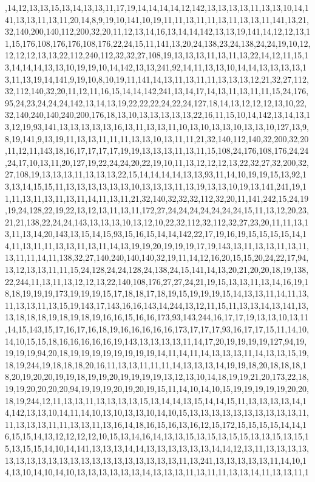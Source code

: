 ,14,12,13,13,15,13,14,13,13,11,17,19,14,14,14,14,12,142,13,13,13,13,11,13,13,10,14,141,13,13,11,13,11,20,14,8,9,19,10,141,10,19,11,11,13,11,11,13,11,13,13,11,141,13,21,32,140,200,140,112,200,32,20,11,12,13,14,16,13,14,14,142,13,13,19,141,14,12,12,13,11,15,176,108,176,176,108,176,22,24,15,11,141,13,20,24,138,23,24,138,24,24,19,10,12,12,12,12,13,13,22,112,240,112,32,32,27,108,19,13,13,13,11,13,11,13,22,14,12,11,15,13,14,14,14,13,13,10,19,19,10,14,142,13,13,241,92,14,11,13,13,10,14,14,13,13,13,13,13,11,13,19,14,141,9,19,10,8,10,19,11,141,14,13,11,13,11,11,13,13,13,12,21,32,27,112,32,112,140,32,20,11,12,11,16,15,14,14,142,241,13,14,17,14,13,11,13,11,11,15,24,176,95,24,23,24,24,24,142,13,14,13,19,22,22,22,24,22,24,127,18,14,13,12,12,12,13,10,22,32,140,240,140,240,200,176,18,13,10,13,13,13,13,13,22,16,11,15,10,14,142,13,14,13,13,12,19,93,141,13,13,13,13,13,16,13,11,13,13,11,10,13,10,13,13,10,13,13,10,127,13,9,8,19,141,9,13,19,11,13,13,11,11,11,13,13,10,13,11,11,21,32,140,112,140,32,200,32,20,11,12,11,143,18,16,17,17,17,17,19,19,13,13,13,11,13,11,15,108,24,176,108,176,24,24,24,17,10,13,11,20,127,19,22,24,24,20,22,19,10,11,13,12,12,12,13,22,32,27,32,200,32,27,108,19,13,13,13,11,13,13,13,22,15,14,14,14,14,13,13,93,11,14,10,19,19,15,13,92,13,13,14,15,15,11,13,13,13,13,13,13,10,13,13,13,11,13,19,13,13,10,19,13,141,241,19,11,11,13,11,13,11,13,11,14,11,13,11,21,32,140,32,32,32,112,32,20,11,141,242,15,24,19,19,24,128,22,19,22,13,12,13,11,13,11,172,27,24,24,24,24,24,24,24,15,11,13,12,20,23,21,21,138,22,24,24,143,13,13,13,10,13,12,10,22,32,112,32,112,32,27,23,20,11,11,13,13,11,13,14,20,143,13,15,14,15,93,15,16,15,14,14,142,22,17,19,16,19,15,15,15,15,14,14,11,13,11,11,13,13,11,13,11,14,13,19,19,20,19,19,19,17,19,143,13,11,13,13,11,13,11,13,11,11,14,11,138,32,27,140,240,140,140,32,19,11,14,12,16,20,15,15,20,24,22,17,94,13,12,13,13,11,11,15,24,128,24,24,128,24,138,24,15,141,14,13,20,21,20,20,18,19,138,22,244,11,13,11,13,12,12,13,22,140,108,176,27,27,24,21,19,15,13,13,11,13,14,16,19,18,18,19,19,19,173,19,19,19,15,17,18,18,17,18,19,15,19,19,19,15,14,13,13,11,14,11,13,11,13,13,11,13,15,19,143,17,143,16,16,143,14,244,13,12,11,15,11,13,13,14,13,141,13,13,18,18,18,19,18,19,18,19,16,16,15,16,16,173,93,143,244,16,17,17,19,13,13,10,13,11,14,15,143,15,17,16,17,16,18,19,16,16,16,16,16,173,17,17,17,93,16,17,17,15,11,14,10,14,10,15,15,18,16,16,16,16,16,19,143,13,13,13,13,11,14,17,20,19,19,19,19,127,94,19,19,19,19,94,20,18,19,19,19,19,19,19,19,19,14,11,14,11,14,13,13,13,11,14,13,13,15,19,18,19,244,19,18,18,18,20,16,11,13,13,11,11,11,14,13,13,13,14,19,19,18,20,18,18,18,18,20,19,20,20,19,19,18,19,19,20,19,19,19,19,13,12,13,10,14,18,19,19,21,20,173,22,18,19,19,20,20,20,20,94,19,19,19,20,19,20,19,15,11,14,10,14,10,15,19,19,19,19,19,20,20,18,19,244,12,11,13,13,11,13,13,13,13,15,13,14,14,13,15,14,14,15,11,13,13,13,13,14,14,142,13,13,10,14,11,14,10,13,10,13,13,10,14,10,15,13,13,13,13,13,13,13,13,13,13,11,11,13,13,13,11,11,13,13,11,13,16,14,18,16,15,16,13,16,12,15,172,15,15,15,15,14,14,16,15,15,14,13,12,12,12,12,10,15,13,14,16,14,13,13,15,13,15,13,15,15,13,13,15,13,15,15,13,15,15,14,10,14,141,13,13,13,14,14,13,13,13,13,13,13,14,14,12,13,11,13,13,13,13,13,13,13,13,13,13,13,13,13,13,13,13,13,13,13,13,11,13,241,13,13,13,13,13,11,14,10,14,13,10,14,10,14,10,13,13,13,13,13,13,14,13,13,13,11,13,11,11,13,13,14,11,13,13,11,1